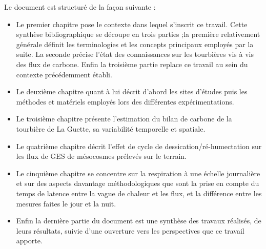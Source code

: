 Le document est structuré de la façon suivante :
\begin{itemize}
\item Le premier chapitre pose le contexte dans lequel s'inscrit ce travail.
Cette synthèse bibliographique se découpe en trois parties ;la première relativement générale définit les terminologies et les concepts principaux employés par la suite.
La seconde précise l'état des connaissances sur les tourbières vis à vis des flux de carbone.
Enfin la troisième partie replace ce travail au sein du contexte précédemment établi.
\item Le deuxième chapitre quant à lui décrit d'abord les sites d'études puis les méthodes et matériels employés lors des différentes expérimentations.
\item Le troisième chapitre présente l'estimation du bilan de carbone de la tourbière de La Guette, sa variabilité temporelle et spatiale.
\item Le quatrième chapitre décrit l'effet de cycle de dessication/ré-humectation sur les flux de GES de mésocosmes prélevés sur le terrain.
\item Le cinquième chapitre se concentre sur la respiration à une échelle journalière et sur des aspects davantage méthodologiques que sont la prise en compte du temps de latence entre la vague de chaleur et les flux, et la différence entre les mesures faites le jour et la nuit.
\item Enfin la dernière partie du document est une synthèse des travaux réalisés, de leurs résultats, suivie d'une ouverture vers les perspectives que ce travail apporte.
\end{itemize}

%
